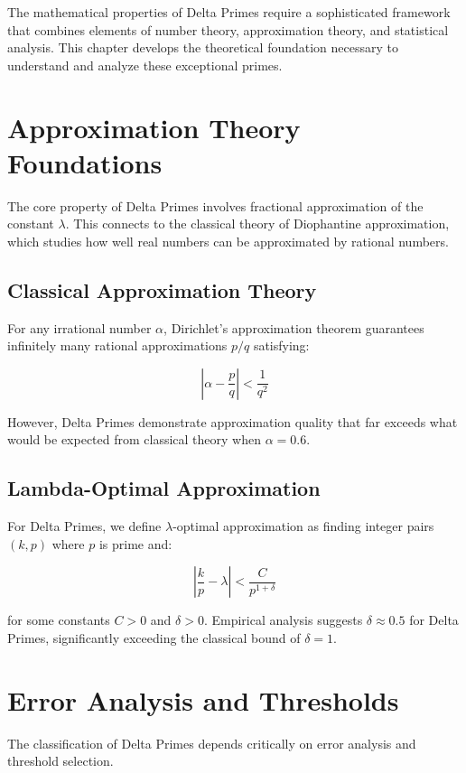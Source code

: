 \documentclass[12pt,a4paper]{report}
\newcommand{\lambdaval}{\lambda}
\begin{document}
The mathematical properties of Delta Primes require a sophisticated framework that combines elements of number theory, approximation theory, and statistical analysis. This chapter develops the theoretical foundation necessary to understand and analyze these exceptional primes.

\section{Approximation Theory Foundations}

The core property of Delta Primes involves fractional approximation of the constant $\lambdaval$. This connects to the classical theory of Diophantine approximation, which studies how well real numbers can be approximated by rational numbers.

\subsection{Classical Approximation Theory}

For any irrational number $\alpha$, Dirichlet's approximation theorem guarantees infinitely many rational approximations $p/q$ satisfying:

\[
\left| \alpha - \frac{p}{q} \right| < \frac{1}{q^2}
\]

However, Delta Primes demonstrate approximation quality that far exceeds what would be expected from classical theory when $\alpha = 0.6$.

\subsection{Lambda-Optimal Approximation}

For Delta Primes, we define $\lambdaval$-optimal approximation as finding integer pairs $(k,p)$ where $p$ is prime and:

\[
\left| \frac{k}{p} - \lambdaval \right| < \frac{C}{p^{1+\delta}}
\]

for some constants $C > 0$ and $\delta > 0$. Empirical analysis suggests $\delta \approx 0.5$ for Delta Primes, significantly exceeding the classical bound of $\delta = 1$.

\section{Error Analysis and Thresholds}

The classification of Delta Primes depends critically on error analysis and threshold selection.
\end{document}

